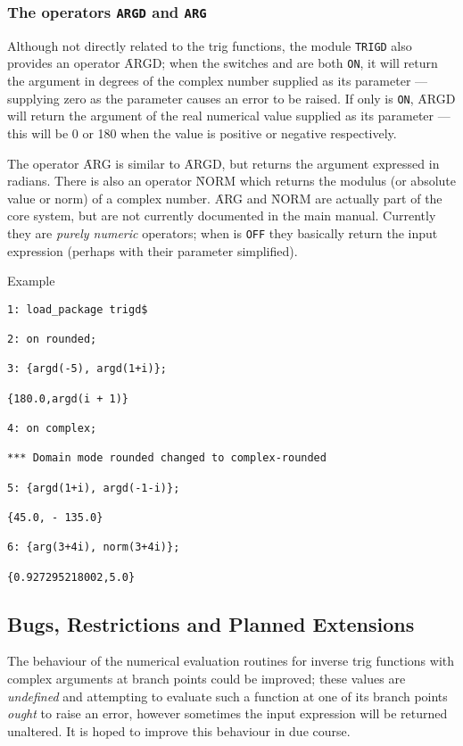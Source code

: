 \subsubsection{The operators \texttt{ARGD} and \texttt{ARG}}

Although not directly related to the trig functions, the module \texttt{TRIGD} also provides an operator \f{ARGD}; when the switches  and  are both \texttt{ON}, it will return the argument in degrees of the complex number supplied as its parameter  --- supplying zero as the parameter causes an error to be raised.
 If only  is \texttt{ON},  
\f{ARGD} will return the argument of the real numerical value supplied as its parameter --- this will be  0 or 180 when the value is positive or negative respectively.

The operator \f{ARG} is similar to \f{ARGD}, but returns the argument expressed in  radians.  There is also an operator \f{NORM} which returns the modulus (or absolute value or norm) of a complex number.  \f{ARG} and \f{NORM} are actually part of the {\REDUCE} core system, but are not currently documented in the main manual.  Currently they are \emph{purely numeric} operators; when  is \texttt{OFF} they basically return the input expression (perhaps with their parameter simplified).

Example
\begin{verbatim}
1: load_package trigd$

2: on rounded;

3: {argd(-5), argd(1+i)};

{180.0,argd(i + 1)}

4: on complex;

*** Domain mode rounded changed to complex-rounded

5: {argd(1+i), argd(-1-i)};

{45.0, - 135.0}

6: {arg(3+4i), norm(3+4i)};

{0.927295218002,5.0}

\end{verbatim}
 
\subsection{Bugs, Restrictions and Planned Extensions}
The behaviour of the numerical evaluation routines for inverse trig functions with complex arguments at branch points could be improved; these values are \emph{undefined} and attempting to evaluate such a function at one of its branch points \emph{ought} to raise an error, however sometimes the input expression will be returned unaltered.  It is hoped to improve this behaviour in due course.

